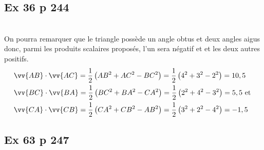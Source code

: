 \documentclass[12pt,a4paper]{book}
\begin{document}
\subsection*{Ex 36 p 244}
\\
On pourra remarquer que le triangle possède un angle obtus et deux angles aigus donc, parmi les produits scalaires proposés, l'un sera négatif et et les deux autres positifs.
$$
\begin{aligned}
&\vv{A B} \cdot \vv{A C}=\dfrac{1}{2}\left(A B^{2}+A C^{2}-B C^{2}\right)=\dfrac{1}{2}\left(4^{2}+3^{2}-2^{2}\right)=10,5 \\
&\vv{B C} \cdot \vv{B A}=\dfrac{1}{2}\left(B C^{2}+B A^{2}-C A^{2}\right)=\dfrac{1}{2}\left(2^{2}+4^{2}-3^{2}\right)=5,5 \text { et } \\
&\vv{C A} \cdot \vv{C B}=\dfrac{1}{2}\left(C A^{2}+C B^{2}-A B^{2}\right)=\dfrac{1}{2}\left(3^{2}+2^{2}-4^{2}\right)=-1,5
\end{aligned}
$$

\subsection*{Ex 63 p 247}
\end{document}
